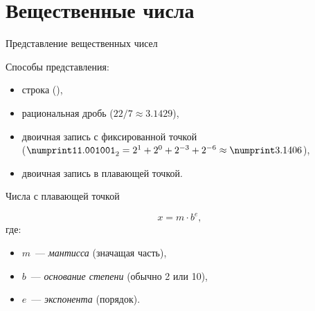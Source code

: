 \section{Вещественные числа}

\begin{frame}{Представление вещественных чисел}

  Способы представления:
  \begin{itemize}
      \pause
    \item строка (),
      \pause
    \item рациональная дробь ($22/7 \approx \num{3.1429}$),
      \pause
    \item двоичная запись с фиксированной точкой\\
      ($\bin{\num{11.001001}} = 2^1 + 2^0 + 2^{-3} + 2^{-6} \approx
        \num{3.1406}$),
      \pause
    \item двоичная запись в плавающей точкой.
  \end{itemize}

\end{frame}

\begin{frame}{Числа с плавающей точкой}

  {\Large \[ x = m \cdot b^e, \] }
  где:
  \begin{itemize}
    \item $m$~--- \emph{мантисса} (значащая часть),
    \item $b$~--- \emph{основание степени} (обычно 2 или 10),
    \item $e$~--- \emph{экспонента} (порядок).
  \end{itemize}

\end{frame}

